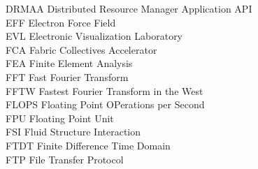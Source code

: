 \begin{tabbing}
DRMAA   \> Distributed Resource Manager  Application API\\
EFF     \> Electron Force Field\\
EVL     \> Electronic Visualization Laboratory\\
FCA     \> Fabric Collectives Accelerator\\
FEA     \> Finite Element Analysis\\
FFT     \> Fast Fourier Transform\\
FFTW    \> Fastest Fourier Transform in the West\\
FLOPS   \> Floating Point OPerations per Second\\
FPU     \> Floating Point Unit\\
FSI     \> Fluid Structure Interaction\\
FTDT    \> Finite Difference Time Domain\\
FTP     \> File Transfer Protocol
\end{tabbing}
